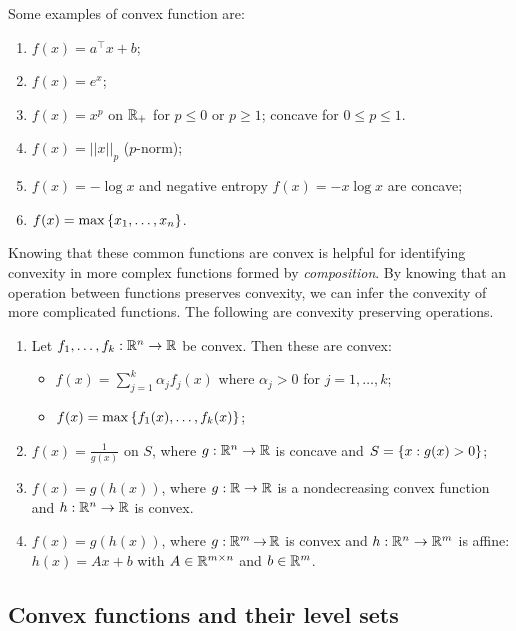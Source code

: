 Some examples of convex function are:
%
\begin{enumerate}
	\item $f(x) = a^\top x + b$;
	\item $f(x) = e^x$;
	\item $f(x) = x^p$ on $\mathbb{R}_+$ for $ p \leq 0$ or $p \geq 1$; concave for $0 \leq p \leq 1$.
	\item $f(x) = ||x||_p$ ($p$-norm);
	\item $f(x) = -\log x $ and negative entropy $f(x) = -x\log x $ are concave;
	\item $f(x) = \max\left\{ x_1, \dots, x_n \right \}$.
\end{enumerate}
%
Knowing that these common functions are convex is helpful for identifying convexity in more complex functions formed by \emph{composition}. By knowing that an operation between functions preserves convexity, we can infer the convexity of more complicated functions. The following are convexity preserving operations.
%
\begin{enumerate}
	\item Let $f_1, \dots, f_k : \mathbb{R}^n \to \mathbb{R}$ be convex. Then these are convex:
	\begin{itemize}
		\item $f(x) = \sum_{j=1}^k\alpha_j f_j(x)$ where $\alpha_j >0$ for $j=1,\dots,k$;
		\item $f(x) = \max\left\{ f_1(x), \dots, f_k(x) \right \}$;
	\end{itemize}
		\item $f(x) = \frac{1}{g(x)}$ on $S$, where $g:\mathbb{R}^n \to \mathbb{R}$ is concave and $S = \left\{ x : g(x) > 0 \right \}$; 
		\item $f(x) = g(h(x))$, where $g: \mathbb{R} \to \mathbb{R}$ is a nondecreasing convex function and $h:\mathbb{R}^n \to \mathbb{R}$ is convex.
	\item $f(x) = g(h(x))$,\hspace{-1pt} where $g: \mathbb{R}^m\hspace{-1pt} \to\hspace{-1pt} \mathbb{R}$ is convex and\hspace{-1pt} $h:\mathbb{R}^n \to \mathbb{R}^m$ is affine: $h(x) = Ax + b$ with $A\in \mathbb{R}^{m\times n}$ and $b\in \mathbb{R}^m$.
\end{enumerate}


\subsection{Convex functions and their level sets}


